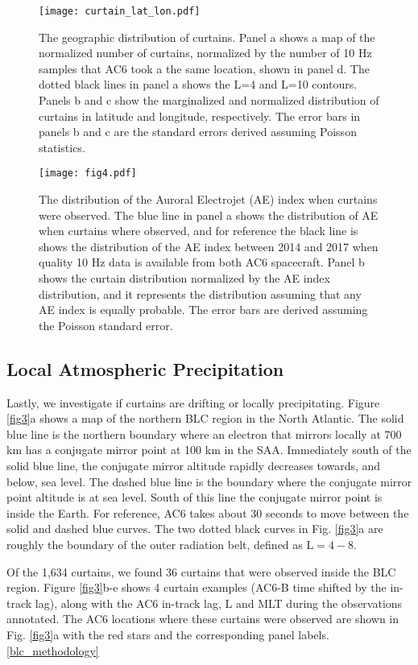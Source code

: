 \documentclass[draft]{agujournal2019}
\begin{document}
\begin{figure}
\texttt{[image: curtain\_lat\_lon.pdf]}
\caption{The geographic distribution of curtains. Panel a shows a map of the normalized number of curtains, normalized by the number of 10 Hz samples that AC6 took a the same location, shown in panel d. The dotted black lines in panel a shows the L=4 and L=10 contours. Panels b and c show the marginalized and normalized distribution of curtains in latitude and longitude, respectively. The error bars in panels b and c are the standard errors derived assuming Poisson statistics.}
\label{curtain_lat_lon}
\end{figure}

\begin{figure}
\texttt{[image: fig4.pdf]}
\caption{The distribution of the Auroral Electrojet (AE) index when curtains were observed. The blue line in panel a shows the distribution of AE when curtains where observed, and for reference the black line is shows the distribution of the AE index between 2014 and 2017 when quality 10 Hz data is available from both AC6 spacecraft. Panel b shows the curtain distribution normalized by the AE index distribution, and it represents the distribution assuming that any AE index is equally probable. The error bars are derived assuming the Poisson standard error.}
\label{ae_dist}
\end{figure}

\subsection{Local Atmospheric Precipitation}
Lastly, we investigate if curtains are drifting or locally precipitating. Figure \ref{fig3}a shows a map of the northern BLC region in the North Atlantic. The solid blue line is the northern boundary where an electron that mirrors locally at 700 km has a conjugate mirror point at 100 km in the SAA. Immediately south of the solid blue line, the conjugate mirror altitude rapidly decreases towards, and below, sea level. The dashed blue line is the boundary where the conjugate mirror point altitude is at sea level. South of this line the conjugate mirror point is inside the Earth. For reference, AC6 takes about 30 seconds to move between the solid and dashed blue curves. The two dotted black curves in Fig. \ref{fig3}a are roughly the boundary of the outer radiation belt, defined as $\mathrm{L}=4-8$.

Of the 1,634 curtains, we found 36 curtains that were observed inside the BLC region. Figure \ref{fig3}b-e shows 4 curtain examples (AC6-B time shifted by the in-track lag), along with the AC6 in-track lag, L and MLT during the observations annotated. The AC6 locations where these curtains were observed are shown in Fig. \ref{fig3}a with the red stars and the corresponding panel labels.  \ref{blc_methodology} 
\end{document}
